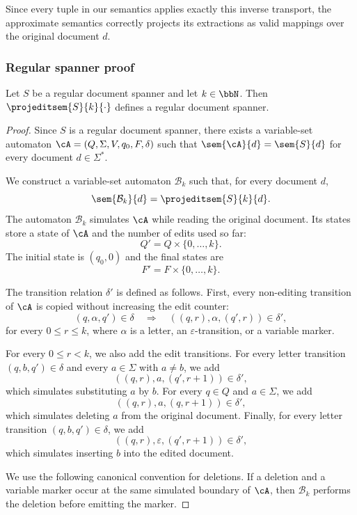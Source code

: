 Since every tuple in our semantics applies exactly this inverse transport, the approximate semantics correctly projects its extractions as valid mappings over the original document $d$.

\subsubsection{Regular spanner proof}

\begin{theorem}\label{thm:approx_regular_spanner}
Let $S$ be a regular document spanner and let $k\in\bbN$. Then $\projeditsem{S}{k}{\cdot}$ defines a regular document spanner.
\end{theorem}


\begin{proof}
	Since $S$ is a regular document spanner, there exists a variable-set automaton $\cA=(Q,\Sigma,V,q_0,F,\delta)$
	such that $\sem{\cA}{d}=\sem{S}{d}$ for every document $d\in\Sigma^*$.

	We construct a variable-set automaton $\mathcal{B}_k$ such that, for every document $d$,
	\[
	\sem{\mathcal{B}_k}{d}=\projeditsem{S}{k}{d}.
	\]
	The automaton $\mathcal{B}_k$ simulates $\cA$ while reading the original document. Its states store a state of $\cA$ and the number of edits used so far:
	\[
	Q' = Q \times \{0,\ldots,k\}.
	\]
	The initial state is $(q_0,0)$ and the final states are
	\[
	F' = F \times \{0,\ldots,k\}.
	\]
	
	The transition relation $\delta'$ is defined as follows. First, every non-editing transition of $\cA$ is copied without increasing the edit counter:
	\[
	(q,\alpha,q')\in\delta
	\quad\Longrightarrow\quad
	((q,r),\alpha,(q',r))\in\delta',
	\]
	for every $0\leq r\leq k$, where $\alpha$ is a letter, an $\varepsilon$-transition, or a variable marker.
	
	For every $0\leq r<k$, we also add the edit transitions. For every letter transition $(q,b,q')\in\delta$ and every $a\in\Sigma$ with $a\neq b$, we add
	\[
	((q,r),a,(q',r+1))\in\delta',
	\]
	which simulates substituting $a$ by $b$. For every $q\in Q$ and $a\in\Sigma$, we add
	\[
	((q,r),a,(q,r+1))\in\delta',
	\]
	which simulates deleting $a$ from the original document. Finally, for every letter transition $(q,b,q')\in\delta$, we add
	\[
	((q,r),\varepsilon,(q',r+1))\in\delta',
	\]
	which simulates inserting $b$ into the edited document.
	
	
	We use the following canonical convention for deletions. If a deletion and a variable marker occur at the same simulated boundary of $\cA$, then $\mathcal{B}_k$ performs the deletion before emitting the marker.
	

\end{proof}
